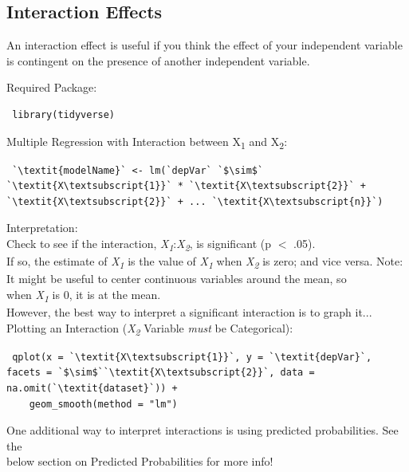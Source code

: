 \documentclass[12pt,letterpaper]{article}
\newcommand{\ind}{\phantom{AA}}
\begin{document}
\subsection{Interaction Effects}
An interaction effect is useful if you think the effect of your independent variable is contingent on the presence of another independent variable.

\vspace{.5em}

\begin{tcolorbox}[title = Interaction Effects]
Required Package:
\begin{lstlisting}
 library(tidyverse)
\end{lstlisting}
Multiple Regression with Interaction between X\textsubscript{1} and X\textsubscript{2}:
\begin{lstlisting}
 `\textit{modelName}` <- lm(`depVar` `$\sim$` `\textit{X\textsubscript{1}}` * `\textit{X\textsubscript{2}}` + `\textit{X\textsubscript{2}}` + ... `\textit{X\textsubscript{n}}`)
\end{lstlisting}
Interpretation:\\
\ind Check to see if the interaction, \textit{X\textsubscript{1}}:\textit{X\textsubscript{2}}, is significant (p $<$ .05).\\
\ind If so, the estimate of \textit{X\textsubscript{1}} is the value of \textit{X\textsubscript{1}} when \textit{X\textsubscript{2}} is zero; and vice versa.
\ind \ind Note: It might be useful to center continuous variables around the mean, so\\ \ind \ind when \textit{X\textsubscript{1}} is 0, it is at the mean.\\
\ind However, the best way to interpret a significant interaction is to graph it...
\vspace{.5em}\\
Plotting an Interaction (\textit{X\textsubscript{2}} Variable \emph{must} be Categorical):
\begin{lstlisting}
 qplot(x = `\textit{X\textsubscript{1}}`, y = `\textit{depVar}`, facets = `$\sim$``\textit{X\textsubscript{2}}`, data = na.omit(`\textit{dataset}`)) + 
    geom_smooth(method = "lm")
\end{lstlisting}
One additional way to interpret interactions is using predicted probabilities. See the\\ \ind below section on Predicted Probabilities for more info!
\end{tcolorbox}
\end{document}
